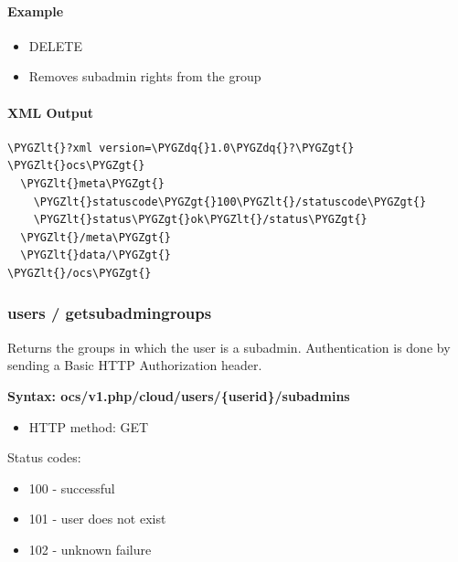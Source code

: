 \documentclass[letterpaper,10pt,english]{sphinxmanual}
\def\PYGZlt{\char`\<}
\def\PYGZgt{\char`\>}
\def\PYGZdq{\char`\"}
\begin{document}
\paragraph{Example}
\label{configuration_user/user_provisioning_api:id16}\begin{itemize}
\item {} 
DELETE

\item {} 
Removes  subadmin rights from the  group

\end{itemize}


\paragraph{XML Output}
\label{configuration_user/user_provisioning_api:id17}
\begin{Verbatim}[commandchars=\\\{\}]
\PYGZlt{}?xml version=\PYGZdq{}1.0\PYGZdq{}?\PYGZgt{}
\PYGZlt{}ocs\PYGZgt{}
  \PYGZlt{}meta\PYGZgt{}
    \PYGZlt{}statuscode\PYGZgt{}100\PYGZlt{}/statuscode\PYGZgt{}
    \PYGZlt{}status\PYGZgt{}ok\PYGZlt{}/status\PYGZgt{}
  \PYGZlt{}/meta\PYGZgt{}
  \PYGZlt{}data/\PYGZgt{}
\PYGZlt{}/ocs\PYGZgt{}
\end{Verbatim}


\subsubsection{\textbf{users / getsubadmingroups}}
\label{configuration_user/user_provisioning_api:users-getsubadmingroups}
Returns the groups in which the user is a subadmin. Authentication is done by
sending a Basic HTTP Authorization header.

\textbf{Syntax: ocs/v1.php/cloud/users/\{userid\}/subadmins}
\begin{itemize}
\item {} 
HTTP method: GET

\end{itemize}

Status codes:
\begin{itemize}
\item {} 
100 - successful

\item {} 
101 - user does not exist

\item {} 
102 - unknown failure

\end{itemize}
\end{document}
